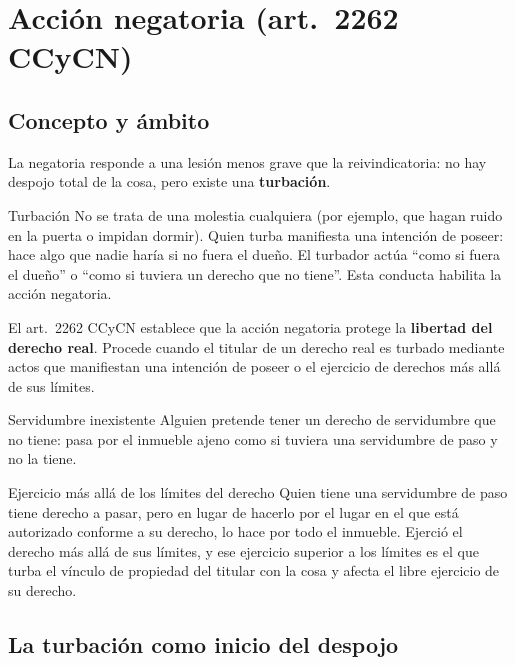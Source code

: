\documentclass[12pt,oneside]{book}
\begin{document}
\section{Acción negatoria (art.\ 2262 CCyCN)}

\subsection{Concepto y ámbito}

La negatoria responde a una lesión menos grave que la reivindicatoria: no hay despojo total de la cosa, pero existe una \textbf{turbación}.

\begin{definition}{Turbación}
No se trata de una molestia cualquiera (por ejemplo, que hagan ruido en la puerta o impidan dormir). Quien turba manifiesta una intención de poseer: hace algo que nadie haría si no fuera el dueño. El turbador actúa ``como si fuera el dueño'' o ``como si tuviera un derecho que no tiene''. Esta conducta habilita la acción negatoria.
\end{definition}

El art.\ 2262 CCyCN establece que la acción negatoria protege la \textbf{libertad del derecho real}. Procede cuando el titular de un derecho real es turbado mediante actos que manifiestan una intención de poseer o el ejercicio de derechos más allá de sus límites.

\begin{example}{Servidumbre inexistente}
Alguien pretende tener un derecho de servidumbre que no tiene: pasa por el inmueble ajeno como si tuviera una servidumbre de paso y no la tiene.
\end{example}

\begin{example}{Ejercicio más allá de los límites del derecho}
Quien tiene una servidumbre de paso tiene derecho a pasar, pero en lugar de hacerlo por el lugar en el que está autorizado conforme a su derecho, lo hace por todo el inmueble. Ejerció el derecho más allá de sus límites, y ese ejercicio superior a los límites es el que turba el vínculo de propiedad del titular con la cosa y afecta el libre ejercicio de su derecho.
\end{example}

\subsection{La turbación como inicio del despojo}
\end{document}
